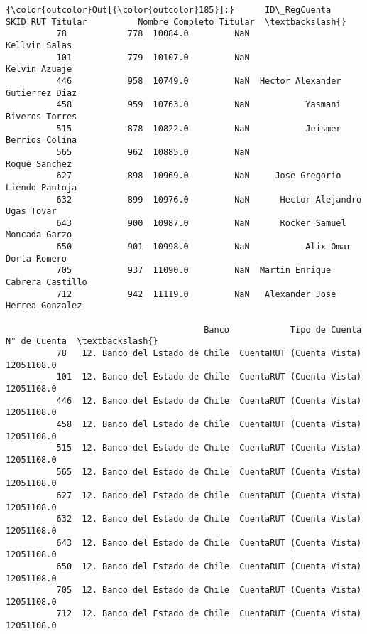\documentclass[11pt]{article}
\begin{document}
\begin{Verbatim}[commandchars=\\\{\}]
{\color{outcolor}Out[{\color{outcolor}185}]:}      ID\_RegCuenta     SKID RUT Titular          Nombre Completo Titular  \textbackslash{}
          78            778  10084.0         NaN                    Kellvin Salas   
          101           779  10107.0         NaN                    Kelvin Azuaje   
          446           958  10749.0         NaN  Hector Alexander Gutierrez Diaz   
          458           959  10763.0         NaN           Yasmani Riveros Torres   
          515           878  10822.0         NaN           Jeismer Berrios Colina   
          565           962  10885.0         NaN                   Roque Sanchez    
          627           898  10969.0         NaN     Jose Gregorio Liendo Pantoja   
          632           899  10976.0         NaN      Hector Alejandro Ugas Tovar   
          643           900  10987.0         NaN      Rocker Samuel Moncada Garzo   
          650           901  10998.0         NaN           Alix Omar Dorta Romero   
          705           937  11090.0         NaN  Martin Enrique Cabrera Castillo   
          712           942  11119.0         NaN   Alexander Jose Herrea Gonzalez   
          
                                       Banco            Tipo de Cuenta  N° de Cuenta  \textbackslash{}
          78   12. Banco del Estado de Chile  CuentaRUT (Cuenta Vista)    12051108.0   
          101  12. Banco del Estado de Chile  CuentaRUT (Cuenta Vista)    12051108.0   
          446  12. Banco del Estado de Chile  CuentaRUT (Cuenta Vista)    12051108.0   
          458  12. Banco del Estado de Chile  CuentaRUT (Cuenta Vista)    12051108.0   
          515  12. Banco del Estado de Chile  CuentaRUT (Cuenta Vista)    12051108.0   
          565  12. Banco del Estado de Chile  CuentaRUT (Cuenta Vista)    12051108.0   
          627  12. Banco del Estado de Chile  CuentaRUT (Cuenta Vista)    12051108.0   
          632  12. Banco del Estado de Chile  CuentaRUT (Cuenta Vista)    12051108.0   
          643  12. Banco del Estado de Chile  CuentaRUT (Cuenta Vista)    12051108.0   
          650  12. Banco del Estado de Chile  CuentaRUT (Cuenta Vista)    12051108.0   
          705  12. Banco del Estado de Chile  CuentaRUT (Cuenta Vista)    12051108.0   
          712  12. Banco del Estado de Chile  CuentaRUT (Cuenta Vista)    12051108.0   
          

\end{Verbatim}
\end{document}
